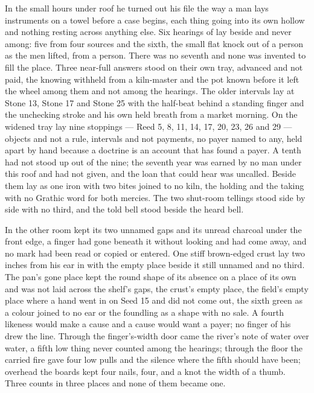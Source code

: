 In the small hours under  roof he turned out his file the way a man lays instruments on a towel before a case begins, each thing going into its own hollow and nothing resting across anything else. Six hearings of  lay beside and never among: five from four sources and the sixth, the small flat knock out of a person as the men lifted, from a person. There was no seventh and none was invented to fill the place. Three near-full answers stood on their own tray, advanced and not paid, the knowing withheld from a kiln-master and the pot known before it left the wheel among them and not among the hearings. The older intervals lay at Stone 13, Stone 17 and Stone 25 with the half-beat behind a standing finger and the unchecking stroke and his own held breath from a market morning. On the widened tray lay nine stoppings --- Reed 5, 8, 11, 14, 17, 20, 23, 26 and 29 --- objects and not a rule, intervals and not payments, no payer named to any, held apart by hand because a doctrine is an account that has found a payer. A tenth had not stood up out of the nine; the seventh year was earned by no man under this roof and had not given, and the loan that could hear was uncalled. Beside them lay  as one iron with two bites joined to no kiln, the holding and the taking with no Grathic word for both mercies. The two shut-room tellings stood side by side with no third, and the told bell stood beside the heard bell.

In the other room  kept its two unnamed gaps and its unread charcoal under the front edge, a finger had gone beneath it without looking and had come away, and no mark had been read or copied or entered. One stiff brown-edged crust lay two inches from his ear in  with the empty place beside it still unnamed and no third. The pan's gone place kept the round shape of its absence on a place of its own and was not laid across the shelf's gaps, the crust's empty place, the field's empty place where a hand went in on Seed 15 and did not come out, the sixth green as a colour joined to no ear or the foundling as a shape with no sale. A fourth likeness would make a cause and a cause would want a payer; no finger of his drew the line. Through the finger's-width door came the river's note of water over water, a fifth low thing never counted among the hearings; through the floor the carried fire gave four low pulls and the silence where the fifth should have been; overhead the boards kept four nails, four, and a knot the width of a thumb. Three counts in three places and none of them became one.


